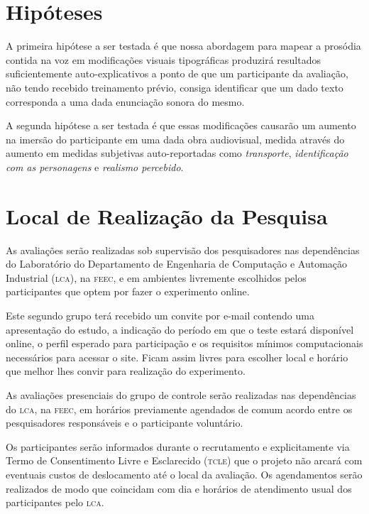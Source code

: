 \documentclass[a4paper,11pt,titlepage,singlespacing]{article}
\begin{document}
\section{Hipóteses}

\noindent A primeira hipótese a ser testada é que nossa abordagem para mapear a prosódia contida na voz em modificações visuais tipográficas produzirá resultados suficientemente auto-explicativos a ponto de que um participante da avaliação, não tendo recebido treinamento prévio, consiga identificar que um dado texto corresponda a uma dada enunciação sonora do mesmo.

A segunda hipótese a ser testada é que essas modificações causarão um aumento na imersão do participante em uma dada obra audiovisual, medida através do aumento em medidas subjetivas auto-reportadas como \textit{transporte}, \textit{identificação com as personagens} e \textit{realismo percebido}.

\section{Local de Realização da Pesquisa}

\noindent As avaliações serão realizadas sob supervisão dos pesquisadores nas dependências do Laboratório do Departamento de Engenharia de Computação e Automação Industrial (\textsc{lca}), na \textsc{feec}, e em ambientes livremente escolhidos pelos participantes que optem por fazer o experimento online. 

Este segundo grupo terá recebido um convite por e-mail contendo uma apresentação do estudo, a indicação do período em que o teste estará disponível online, o perfil esperado para participação e os requisitos mínimos computacionais necessários para acessar o site. Ficam assim livres para escolher local e horário que melhor lhes convir para realização do experimento.

As avaliações presenciais do grupo de controle serão realizadas nas dependências do \textsc{lca}, na \textsc{feec}, em horários previamente agendados de comum acordo entre os pesquisadores responsáveis e o participante voluntário.

Os participantes serão informados durante o recrutamento e explicitamente via Termo de Consentimento Livre e Esclarecido (\textsc{tcle}) que o projeto não arcará com eventuais custos de deslocamento até o local da avaliação. Os agendamentos serão realizados de modo que coincidam com dia e horários de atendimento usual dos participantes pelo \textsc{lca}.
\end{document}
